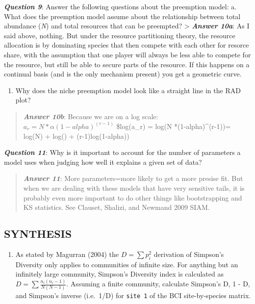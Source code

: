 \documentclass[
]{article}
\providecommand{\tightlist}{%
  \setlength{\itemsep}{0pt}\setlength{\parskip}{0pt}}
\begin{document}
\textbf{\emph{Question 9}}: Answer the following questions about the
preemption model: a. What does the preemption model assume about the
relationship between total abundance (\emph{N}) and total resources that
can be preempted? \textgreater{} \textbf{\emph{Answer 10a}}: As I said
above, nothing. But under the resource partitioning theory, the resource
allocation is by dominating species that then compete with each other
for resorce share, with the assumption that one player will always be
less able to compete for the resource, but still be able to secure parts
of the resource. If this happens on a continual basis (and is the only
mechanism present) you get a geometric curve.

\begin{enumerate}
\def\labelenumi{\alph{enumi}.}
\setcounter{enumi}{1}
\tightlist
\item
  Why does the niche preemption model look like a straight line in the
  RAD plot?
\end{enumerate}

\begin{quote}
\textbf{\emph{Answer 10b}}: Because we are on a log scale:
\(a_r = N *\alpha (1-alpha)^(r-1)\) \$log(a\_r) = log(N
*\alpha (1-alpha)\^{}(r-1))= log(N) + log(\alpha) + (r-1)log(1-alpha))
\end{quote}

\textbf{\emph{Question 11}}: Why is it important to account for the
number of parameters a model uses when judging how well it explains a
given set of data?

\begin{quote}
\textbf{\emph{Answer 11}}: More parameters=more likely to get a more
presise fit. But when we are dealing with these models that have very
sensitive tails, it is probably even more important to do other things
like bootstrapping and KS statistics. See Clauset, Shalizi, and Newmand
2009 SIAM.
\end{quote}

\hypertarget{synthesis}{%
\subsection{SYNTHESIS}\label{synthesis}}

\begin{enumerate}
\def\labelenumi{\arabic{enumi}.}
\tightlist
\item
  As stated by Magurran (2004) the \({D = } \sum p_i^2\) derivation of
  Simpson's Diversity only applies to communities of infinite size. For
  anything but an infinitely large community, Simpson's Diversity index
  is calculated as \({D = } \sum \frac{n_i(n_i -1)} {N(N-1)}\). Assuming
  a finite community, calculate Simpson's D, 1 - D, and Simpson's
  inverse (i.e.~1/D) for \texttt{site\ 1} of the BCI site-by-species
  matrix.
\end{enumerate}
\end{document}
